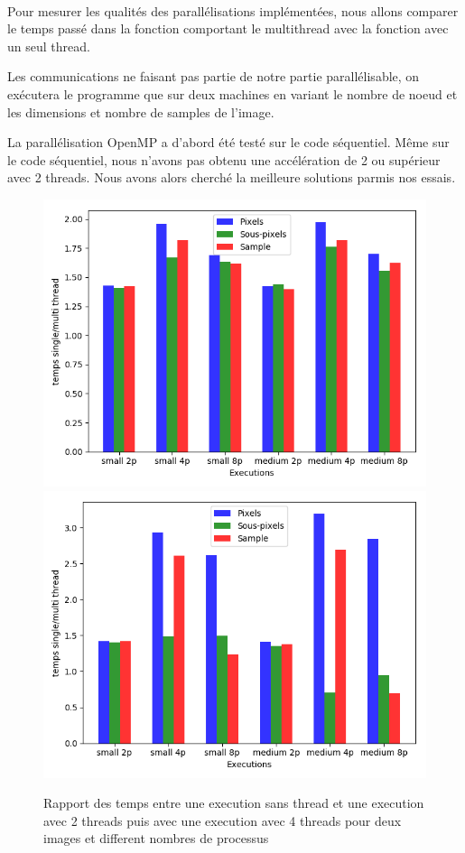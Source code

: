 \documentclass{article}
\begin{document}
\paragraph{}
Pour mesurer les qualit\'es des parall\'elisations impl\'ement\'ees, nous allons comparer le temps pass\'e dans la fonction 
comportant le multithread avec la fonction avec un seul thread.

Les communications ne faisant pas partie de notre partie parall\'elisable, 
on ex\'ecutera le programme que sur deux machines en variant le nombre de noeud et les dimensions et nombre de samples de l'image.

La parall\'elisation OpenMP a d'abord \'et\'e test\'e sur le code s\'equentiel. 
M\^eme sur le code s\'equentiel, nous n'avons pas obtenu une acc\'el\'eration de 2 ou sup\'erieur avec 2 threads. 
Nous avons alors cherch\'e la meilleure solutions parmis nos essais.


\begin{figure}[h!]
  \includegraphics[scale=0.5, center]{rapports_partie2-1.png}
  \includegraphics[scale=0.5, center]{rapports_partie2-2.png}
  \caption{Rapport des temps entre une execution sans thread et une execution avec 2 threads puis avec une execution avec 4 threads pour deux images et different nombres de processus}
\end{figure} 
\end{document}
